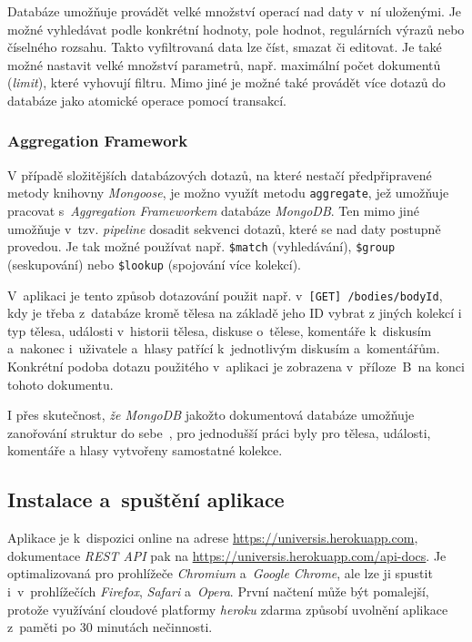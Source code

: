 \documentclass[a4paper,12pt]{article}
\def\code#1{\texttt{#1}}
\begin{document}
Databáze umožňuje provádět velké množství operací nad daty v~ní uloženými. Je možné vyhledávat podle konkrétní hodnoty, pole hodnot, regulárních výrazů nebo číselného rozsahu. Takto vyfiltrovaná data lze číst, smazat či editovat. Je také možné nastavit velké množství parametrů, např. maximální počet dokumentů (\textit{limit}), které vyhovují filtru. Mimo jiné je možné také provádět více dotazů do databáze jako atomické operace pomocí transakcí.~\cite{nodebook}



\vspace*{-0.5cm}
\subsubsection{Aggregation Framework}

V případě složitějších databázových dotazů, na které nestačí předpřipravené metody knihovny \textit{Mongoose}, je možno využít metodu \code{aggregate}, jež umožňuje pracovat s~\textit{Aggregation Frameworkem} databáze \textit{MongoDB}. Ten mimo jiné umožňuje v~tzv. \textit{pipeline} dosadit sekvenci dotazů, které se nad daty postupně provedou. Je tak možné používat např. \code{\$match} (vyhledávání), \code {\$group} (seskupování) nebo \code{\$lookup} (spojování více kolekcí).~\cite{aggregation}

V~aplikaci je tento způsob dotazování použit např. v~\code{[GET] /bodies/{bodyId}}, kdy je třeba z~databáze kromě tělesa na základě jeho ID vybrat z jiných kolekcí i typ tělesa, události v~historii tělesa, diskuse o~tělese, komentáře k~diskusím a~nakonec i~uživatele a~hlasy patřící k~jednotlivým diskusím a~komentářům. Konkrétní podoba dotazu použitého v~aplikaci je zobrazena v~příloze~B~na konci tohoto dokumentu.

I přes skutečnost, \textit{že MongoDB} jakožto dokumentová databáze umožňuje zanořování struktur do sebe~\cite{mongomongoose}, pro jednodušší práci byly pro tělesa, události, komentáře a hlasy vytvořeny samostatné kolekce.

\subsection{Instalace a~spuštění aplikace}

Aplikace je k~dispozici online na adrese \url{https://universis.herokuapp.com}, dokumentace \textit{REST API} pak na \url{https://universis.herokuapp.com/api-docs}. Je optimalizovaná pro prohlížeče \textit{Chromium} a~\textit{Google Chrome}, ale lze ji spustit i~v~prohlížečích \textit{Firefox}, \textit{Safari} a~\textit{Opera}. První načtení může být pomalejší, protože využívání cloudové platformy \textit{heroku} zdarma způsobí uvolnění aplikace z~paměti po 30 minutách nečinnosti. 
\end{document}
